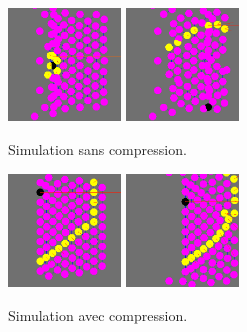 \documentclass{beamer}
\begin{document}
\begin{frame}
  \begin{figure}
    \begin{center}
      \includegraphics[width=3cm]{Images/normal_1.png}
      \includegraphics[width=3cm]{Images/normal_2.png}
    \end{center}
    \caption{Simulation sans compression.}
  \end{figure}
  \begin{figure}
    \begin{center}
      \includegraphics[width=3cm]{Images/compression_1.png}
      \includegraphics[width=3cm]{Images/compression_2.png}
    \end{center}
    \caption{Simulation avec compression.}
  \end{figure}
\end{frame}
\end{document}
